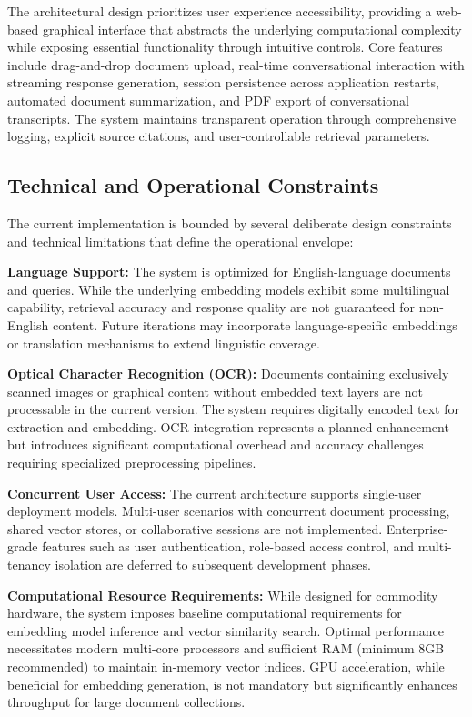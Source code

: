 The architectural design prioritizes user experience accessibility, providing a web-based graphical interface that abstracts the underlying computational complexity while exposing essential functionality through intuitive controls. Core features include drag-and-drop document upload, real-time conversational interaction with streaming response generation, session persistence across application restarts, automated document summarization, and PDF export of conversational transcripts. The system maintains transparent operation through comprehensive logging, explicit source citations, and user-controllable retrieval parameters.

\subsection{Technical and Operational Constraints}

The current implementation is bounded by several deliberate design constraints and technical limitations that define the operational envelope:

\textbf{Language Support:} The system is optimized for English-language documents and queries. While the underlying embedding models exhibit some multilingual capability, retrieval accuracy and response quality are not guaranteed for non-English content. Future iterations may incorporate language-specific embeddings or translation mechanisms to extend linguistic coverage.

\textbf{Optical Character Recognition (OCR):} Documents containing exclusively scanned images or graphical content without embedded text layers are not processable in the current version. The system requires digitally encoded text for extraction and embedding. OCR integration represents a planned enhancement but introduces significant computational overhead and accuracy challenges requiring specialized preprocessing pipelines.

\textbf{Concurrent User Access:} The current architecture supports single-user deployment models. Multi-user scenarios with concurrent document processing, shared vector stores, or collaborative sessions are not implemented. Enterprise-grade features such as user authentication, role-based access control, and multi-tenancy isolation are deferred to subsequent development phases.

\textbf{Computational Resource Requirements:} While designed for commodity hardware, the system imposes baseline computational requirements for embedding model inference and vector similarity search. Optimal performance necessitates modern multi-core processors and sufficient RAM (minimum 8GB recommended) to maintain in-memory vector indices. GPU acceleration, while beneficial for embedding generation, is not mandatory but significantly enhances throughput for large document collections.


